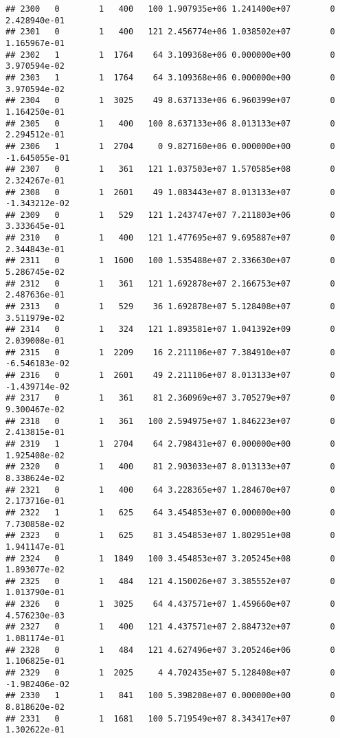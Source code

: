 \documentclass[
]{article}
\begin{document}
\begin{enumerate}
\begin{verbatim}
## 2300   0        1   400   100 1.907935e+06 1.241400e+07        0  2.428940e-01
## 2301   0        1   400   121 2.456774e+06 1.038502e+07        0  1.165967e-01
## 2302   1        1  1764    64 3.109368e+06 0.000000e+00        0  3.970594e-02
## 2303   1        1  1764    64 3.109368e+06 0.000000e+00        0  3.970594e-02
## 2304   0        1  3025    49 8.637133e+06 6.960399e+07        0  1.164250e-01
## 2305   0        1   400   100 8.637133e+06 8.013133e+07        0  2.294512e-01
## 2306   1        1  2704     0 9.827160e+06 0.000000e+00        0 -1.645055e-01
## 2307   0        1   361   121 1.037503e+07 1.570585e+08        0  2.324267e-01
## 2308   0        1  2601    49 1.083443e+07 8.013133e+07        0 -1.343212e-02
## 2309   0        1   529   121 1.243747e+07 7.211803e+06        0  3.333645e-01
## 2310   0        1   400   121 1.477695e+07 9.695887e+07        0  2.344843e-01
## 2311   0        1  1600   100 1.535488e+07 2.336630e+07        0  5.286745e-02
## 2312   0        1   361   121 1.692878e+07 2.166753e+07        0  2.487636e-01
## 2313   0        1   529    36 1.692878e+07 5.128408e+07        0  3.511979e-02
## 2314   0        1   324   121 1.893581e+07 1.041392e+09        0  2.039008e-01
## 2315   0        1  2209    16 2.211106e+07 7.384910e+07        0 -6.546183e-02
## 2316   0        1  2601    49 2.211106e+07 8.013133e+07        0 -1.439714e-02
## 2317   0        1   361    81 2.360969e+07 3.705279e+07        0  9.300467e-02
## 2318   0        1   361   100 2.594975e+07 1.846223e+07        0  2.413815e-01
## 2319   1        1  2704    64 2.798431e+07 0.000000e+00        0  1.925408e-02
## 2320   0        1   400    81 2.903033e+07 8.013133e+07        0  8.338624e-02
## 2321   0        1   400    64 3.228365e+07 1.284670e+07        0  2.173716e-01
## 2322   1        1   625    64 3.454853e+07 0.000000e+00        0  7.730858e-02
## 2323   0        1   625    81 3.454853e+07 1.802951e+08        0  1.941147e-01
## 2324   0        1  1849   100 3.454853e+07 3.205245e+08        0  1.893077e-02
## 2325   0        1   484   121 4.150026e+07 3.385552e+07        0  1.013790e-01
## 2326   0        1  3025    64 4.437571e+07 1.459660e+07        0  4.576230e-03
## 2327   0        1   400   121 4.437571e+07 2.884732e+07        0  1.081174e-01
## 2328   0        1   484   121 4.627496e+07 3.205246e+06        0  1.106825e-01
## 2329   0        1  2025     4 4.702435e+07 5.128408e+07        0 -1.982406e-02
## 2330   1        1   841   100 5.398208e+07 0.000000e+00        0  8.818620e-02
## 2331   0        1  1681   100 5.719549e+07 8.343417e+07        0  1.302622e-01

\end{verbatim}
\end{enumerate}
\end{document}
